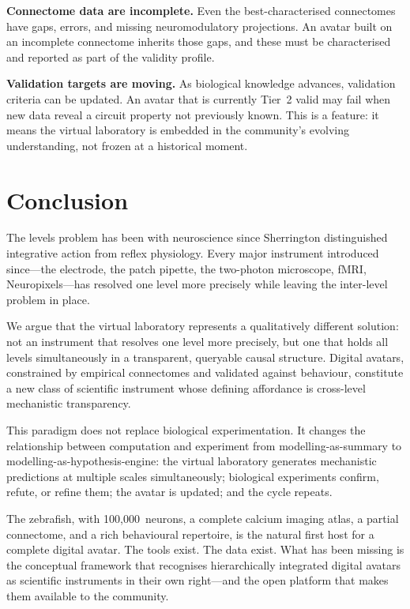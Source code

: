 \documentclass[12pt,a4paper]{article}
\begin{document}
\textbf{Connectome data are incomplete.}
Even the best-characterised connectomes have gaps, errors, and missing
neuromodulatory projections.
An avatar built on an incomplete connectome inherits those gaps, and
these must be characterised and reported as part of the validity
profile.

\textbf{Validation targets are moving.}
As biological knowledge advances, validation criteria can be updated.
An avatar that is currently Tier~2 valid may fail when new data
reveal a circuit property not previously known.
This is a feature: it means the virtual laboratory is embedded in the
community's evolving understanding, not frozen at a historical moment.


\section*{Conclusion}

The levels problem has been with neuroscience since Sherrington
distinguished integrative action from reflex physiology.
Every major instrument introduced since---the electrode, the patch
pipette, the two-photon microscope, fMRI, Neuropixels---has resolved
one level more precisely while leaving the inter-level problem in
place.

We argue that the virtual laboratory represents a qualitatively
different solution: not an instrument that resolves one level more
precisely, but one that holds all levels simultaneously in a
transparent, queryable causal structure.
Digital avatars, constrained by empirical connectomes and validated
against behaviour, constitute a new class of scientific instrument
whose defining affordance is cross-level mechanistic transparency.

This paradigm does not replace biological experimentation.
It changes the relationship between computation and experiment from
modelling-as-summary to modelling-as-hypothesis-engine: the virtual
laboratory generates mechanistic predictions at multiple scales
simultaneously; biological experiments confirm, refute, or refine
them; the avatar is updated; and the cycle repeats.

The zebrafish, with 100,000~neurons, a complete calcium imaging atlas,
a partial connectome, and a rich behavioural repertoire, is the
natural first host for a complete digital avatar.
The tools exist.
The data exist.
What has been missing is the conceptual framework that recognises
hierarchically integrated digital avatars as scientific instruments
in their own right---and the open platform that makes them available
to the community.
\end{document}
